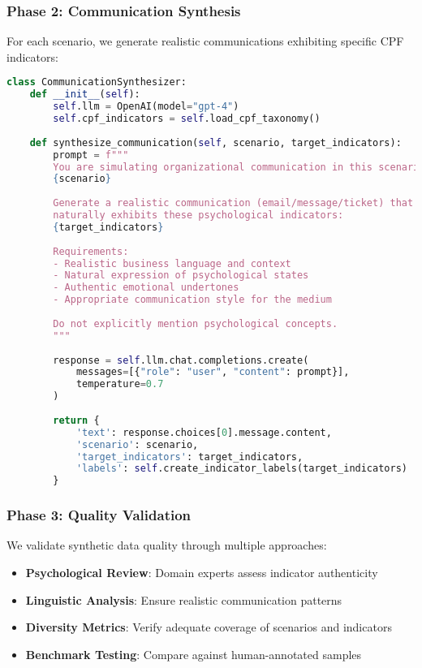 \documentclass[11pt,a4paper]{article}
\begin{document}
\subsubsection{Phase 2: Communication Synthesis}

For each scenario, we generate realistic communications exhibiting specific CPF indicators:

\begin{lstlisting}[language=Python, caption=Communication Synthesis]
class CommunicationSynthesizer:
    def __init__(self):
        self.llm = OpenAI(model="gpt-4")
        self.cpf_indicators = self.load_cpf_taxonomy()
        
    def synthesize_communication(self, scenario, target_indicators):
        prompt = f"""
        You are simulating organizational communication in this scenario:
        {scenario}
        
        Generate a realistic communication (email/message/ticket) that 
        naturally exhibits these psychological indicators:
        {target_indicators}
        
        Requirements:
        - Realistic business language and context
        - Natural expression of psychological states
        - Authentic emotional undertones
        - Appropriate communication style for the medium
        
        Do not explicitly mention psychological concepts.
        """
        
        response = self.llm.chat.completions.create(
            messages=[{"role": "user", "content": prompt}],
            temperature=0.7
        )
        
        return {
            'text': response.choices[0].message.content,
            'scenario': scenario,
            'target_indicators': target_indicators,
            'labels': self.create_indicator_labels(target_indicators)
        }
\end{lstlisting}

\subsubsection{Phase 3: Quality Validation}

We validate synthetic data quality through multiple approaches:

\begin{itemize}
\item \textbf{Psychological Review}: Domain experts assess indicator authenticity
\item \textbf{Linguistic Analysis}: Ensure realistic communication patterns
\item \textbf{Diversity Metrics}: Verify adequate coverage of scenarios and indicators
\item \textbf{Benchmark Testing}: Compare against human-annotated samples
\end{itemize}
\end{document}
